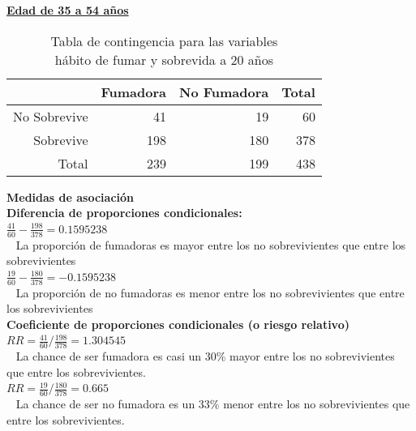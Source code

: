 \documentclass[12pt,letterpaper,fleqn]{article}
\begin{document}
\begin{enumerate}[label=\textbf{\arabic*.}]
\begin{enumerate}[label=\textbf{\alph*.}]
                \underline{\textbf{Edad de 35 a 54 años}}
                \begin{table}[ht]
                    \centering
                    \caption{Tabla de contingencia para las variables \\ hábito de fumar y sobrevida a 20 años}
                    \begin{tabular}{rrrr}
                      \hline
                     & Fumadora & No Fumadora \vline& Total \\
                      \hline
                    No Sobrevive & 41 & 19 \vline& 60 \\
                      Sobrevive & 198 & 180 \vline& 378 \\
                      \hline
                      Total & 239 & 199\vline & 438 \\
                       \hline
                    \end{tabular}
                \end{table}

                \textbf{Medidas de asociación} \\
                \textbf{Diferencia de proporciones condicionales:} \\
                $ \frac{41}{60}-\frac{198}{378} = 0.1595238 $ \\ 
                La proporción de fumadoras es mayor entre los no sobrevivientes que entre los sobrevivientes \\
                $ \frac{19}{60}-\frac{180}{378} = -0.1595238 $ \\ 
                La proporción de no fumadoras es menor entre los no sobrevivientes que entre los sobrevivientes\\

                \textbf{Coeficiente de proporciones condicionales (o riesgo relativo)}\\
                 $ RR =  \frac{41}{60}/\frac{198}{378} = 1.304545 $ \\ 
                 La chance de ser fumadora es casi un 30\% mayor entre los no sobrevivientes que entre los sobrevivientes.\\
                 $ RR =  \frac{19}{60}/\frac{180}{378} = 0.665 $ \\ 
                 La chance de ser no fumadora es un 33\% menor entre los no sobrevivientes que entre los sobrevivientes.\\


\end{enumerate}
\end{enumerate}
\end{document}
